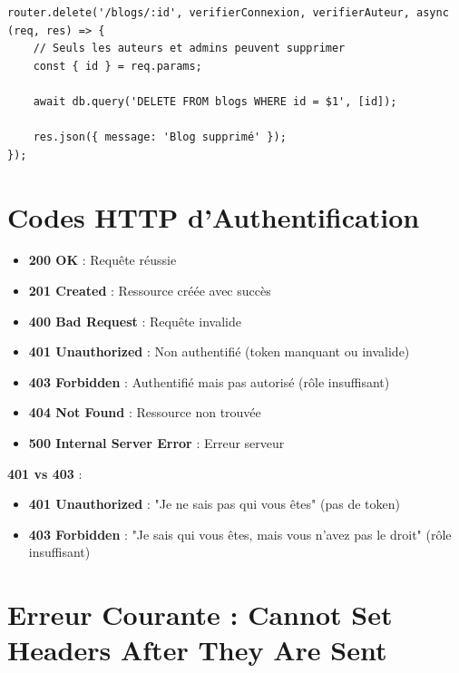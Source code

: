 \begin{lstlisting}[style=javascript, caption=Route avec rôle spécifique]
router.delete('/blogs/:id', verifierConnexion, verifierAuteur, async (req, res) => {
    // Seuls les auteurs et admins peuvent supprimer
    const { id } = req.params;
    
    await db.query('DELETE FROM blogs WHERE id = $1', [id]);
    
    res.json({ message: 'Blog supprimé' });
});
\end{lstlisting}

\section{Codes HTTP d'Authentification}

\begin{itemize}
    \item \textbf{200 OK} : Requête réussie
    \item \textbf{201 Created} : Ressource créée avec succès
    \item \textbf{400 Bad Request} : Requête invalide
    \item \textbf{401 Unauthorized} : Non authentifié (token manquant ou invalide)
    \item \textbf{403 Forbidden} : Authentifié mais pas autorisé (rôle insuffisant)
    \item \textbf{404 Not Found} : Ressource non trouvée
    \item \textbf{500 Internal Server Error} : Erreur serveur
\end{itemize}

\begin{definitionbox}
    \textbf{401 vs 403} :
    \begin{itemize}
        \item \textbf{401 Unauthorized} : "Je ne sais pas qui vous êtes" (pas de token)
        \item \textbf{403 Forbidden} : "Je sais qui vous êtes, mais vous n'avez pas le droit" (rôle insuffisant)
    \end{itemize}
\end{definitionbox}

\section{Erreur Courante : Cannot Set Headers After They Are Sent}

